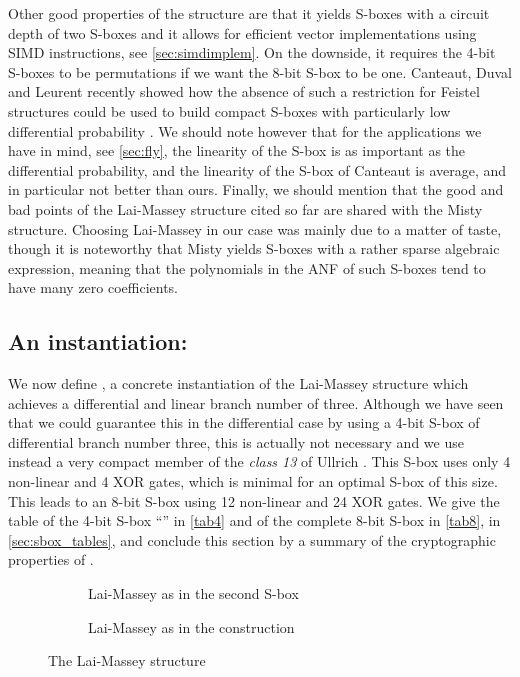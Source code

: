 Other good properties of the structure are that it yields S-boxes with a
circuit depth of two S-boxes and it allows for efficient vector implementations using SIMD instructions,
see \autoref{sec:simdimplem}.
On the downside, it requires the 4-bit S-boxes to be permutations if we want the
8-bit S-box to be one. Canteaut, Duval and Leurent recently showed how the absence of such a restriction
for Feistel structures could be used to build compact S-boxes with particularly low differential probability
\cite{sac15}. We should note however that for the applications we have in mind, see \autoref{sec:fly},
the linearity of the
S-box is as important as the differential probability, and the linearity of the S-box of Canteaut \etal is
average, and in particular not better than ours.
Finally, we should mention that the good and bad points of the Lai-Massey structure cited so far
are shared with the Misty structure. Choosing Lai-Massey in our case was mainly due to a matter of
taste, though it is noteworthy that Misty yields S-boxes with a rather sparse algebraic expression,
meaning that the polynomials in the ANF of such S-boxes tend to have many zero coefficients.

\subsection{An instantiation: \littlunOne}

We now define \littlunOne, a concrete instantiation of the Lai-Massey structure which
achieves a differential and linear branch number of three.
Although we have seen that we could guarantee this in the differential case by using a 4-bit
S-box of differential branch number three, this is actually not necessary and we use instead a very compact
member of the \emph{class 13} of Ullrich \etal \cite{skew}. This S-box uses only 4 non-linear
and 4 XOR gates, which is minimal for an optimal S-box of this size. This leads to an
8-bit S-box using 12 non-linear and 24 XOR gates.
We give the table of the 4-bit S-box ``\littlunS'' in \autoref{tab4} and of the complete 8-bit
S-box in \autoref{tab8}, in \autoref{sec:sbox_tables}, and conclude this section by a summary of the cryptographic properties
of \littlunOne.

\begin{figure}[ht]
\centering
\begin{subfigure}[b]{0.45\textwidth}
\centering

\caption{Lai-Massey as in the \whirlpool second S-box\label{whirlpoolS}}
\end{subfigure}
\begin{subfigure}[b]{0.45\textwidth}
\centering

\caption{Lai-Massey as in the \littlun construction\label{littlunS}}
\end{subfigure}
\caption{The Lai-Massey structure}
\end{figure}

